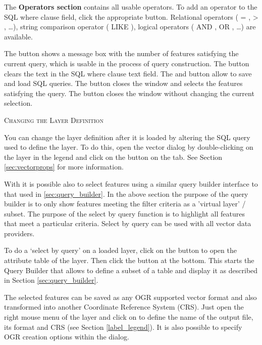 The \textbf{Operators section} contains all usable operators. To add an operator
to the SQL where clause field, click the appropriate button. Relational operators
( = , > , \dots), string comparison operator ( LIKE ), logical operators ( AND , OR
, \dots) are available.

The  button shows a message box with the number of features 
satisfying the current query, which is usable in the process of query 
construction. The  button clears the text in the SQL where clause 
text field. The  and  button allow to save and load 
SQL queries. The  button closes the window and selects the features 
satisfying the query. The  button closes the window without 
changing the current selection.

\begin{Tip}\caption{\textsc{Changing the Layer Definition}}
You can change the layer definition after it is loaded by altering the SQL query 
used to define the layer. To do this, open the vector  
dialog by double-clicking on the layer in the legend and click on the 
 button on the  tab. See Section
\ref{sec:vectorprops} for more information.
\end{Tip}

\label{sec:select_by_query}

With \qg it is possible also to select features using a similar query builder
interface to that used in \ref{sec:query_builder}. In the above section
the purpose of the query builder is to only show features meeting the
filter criteria as a 'virtual layer' / subset. The purpose of the select by
query function is to highlight all features that meet a particular criteria.
Select by query can be used with all vector data providers.

To do a `select by query' on a loaded layer, click on the button  to open the attribute table of the layer. Then
click the  button at the bottom. This starts the Query Builder
that allows to define a subset of a table and display it as described in Section
\ref{sec:query_builder}.


The selected features can be saved as any OGR supported vector format and also
transformed into another Coordinate Reference System (CRS). Just open the right 
mouse menu of the layer and click on  to define 
the name of the output file, its format and CRS (see Section \ref{label_legend}). 
It is also possible to specify OGR creation options within the dialog.

